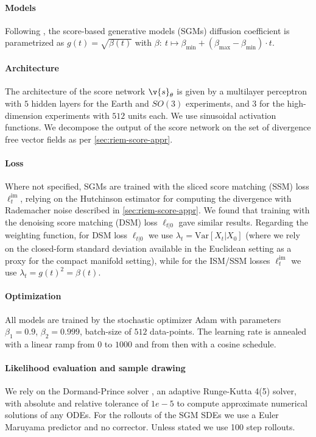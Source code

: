 \paragraph{Models}
Following \textcite{song2020score}, the score-based generative models (SGMs) diffusion coefficient is parametrized as $g(t) = \sqrt{\beta(t)}$ with $\beta: \ t \mapsto \beta_{\min} + (\beta_{\max} - \beta_{\min}) \cdot t$.
\paragraph{Architecture}
The architecture of the score network $\v{s}_\theta$ is given by a multilayer perceptron with $5$ hidden layers for the Earth and $SO(3)$ experiments, and $3$ for the high-dimension experiments with $512$ units each.
We use sinusoidal activation functions.
We decompose the output of the score network on the set of divergence free vector fields as per \cref{sec:riem-score-appr}.

\paragraph{Loss}
Where not specified, SGMs are trained with the sliced score matching (SSM) loss $\ell^{\mathrm{im}}_t$, relying on the Hutchinson estimator for computing the divergence with Rademacher noise described in \cref{sec:riem-score-appr}.
We found that training with the denoising score matching (DSM) loss $\ell_{t|0}$ gave similar results.
Regarding the weighting function, for DSM loss $\ell_{t|0}$ we use $\lambda_t = \text{Var}[X_t|X_0]$ (where we rely on the closed-form standard deviation available in the Euclidean setting as a proxy for the compact manifold setting), while for the ISM/SSM losses $\ell^{\mathrm{im}}_t$ we use $\lambda_t = g(t)^2 = \beta(t)$.

\paragraph{Optimization}
All models are trained by the stochastic optimizer Adam \parencite{kingma2015Adam} with parameters $\beta_1=0.9$, $\beta_2=0.999$, batch-size of $512$ data-points.
The learning rate is annealed with a linear ramp from $0$ to $1000$ and from then with a cosine schedule.

\paragraph{Likelihood evaluation and sample drawing}
We rely on the Dormand-Prince solver \parencite{dormand1980family}, an adaptive Runge-Kutta 4(5) solver, with absolute and relative tolerance of $1e-5$ to compute approximate numerical solutions of any ODEs.
For the rollouts of the SGM SDEs we use a Euler Maruyama predictor and no corrector.
Unless stated we use 100 step rollouts.

